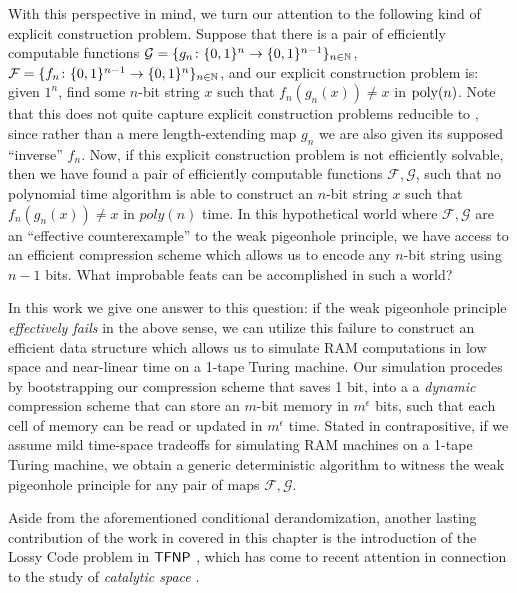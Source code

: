 With this perspective in mind, we turn our attention to the following kind of explicit construction problem. Suppose that there is a pair of efficiently computable functions  $\mathcal{G} = \{g_n \colon \{0,1\}^{n} \rightarrow \{0,1\}^{n-1}\}_{n \in \mathbb{N}}$, $\mathcal{F} = \{f_n \colon \{0,1\}^{n-1} \rightarrow \{0,1\}^n\}_{n \in \mathbb{N}}$, and our explicit construction problem is: given $1^n$, find some $n$-bit string $x$ such that $f_n(g_n(x)) \neq x$ in $\mathrm{poly}(n)$. Note that this does not quite capture explicit construction problems reducible to \avoid, since rather than a mere length-extending map $g_n$ we are also given its supposed ``inverse'' $f_n$. Now, if this explicit construction problem is not efficiently solvable, then we have found a pair of efficiently computable functions $\mathcal{F}, \mathcal{G}$, such that no polynomial time algorithm is able to construct an $n$-bit string $x$ such that $f_n(g_n(x)) \neq x$ in $poly(n)$ time. 
In this hypothetical world where $\mathcal{F}, \mathcal{G}$ are an ``effective counterexample'' to the weak pigeonhole principle, we have access to an efficient compression scheme which allows us to encode any $n$-bit string using $n-1$ bits. What improbable feats can be accomplished in such a world? 

In this work we give one answer to this question: if the weak pigeonhole principle \emph{effectively fails} in the above sense, we can utilize this failure to construct an efficient data structure which allows us to simulate RAM computations in low space and near-linear time on a 1-tape Turing machine. Our simulation procedes by bootstrapping our compression scheme that saves 1 bit, into a a \emph{dynamic} compression scheme that can store an $m$-bit memory in $m^{\epsilon}$ bits, such that each cell of memory can be read or updated in $m^{\epsilon}$ time. 
Stated in contrapositive, if we assume mild time-space tradeoffs for simulating RAM machines on a 1-tape Turing machine, we obtain a generic deterministic algorithm to witness the weak pigeonhole principle for any pair of maps  $\mathcal{F}, \mathcal{G}$. 

Aside from the aforementioned conditional derandomization, another lasting contribution of the work in \cite{time-space} covered in this chapter is the introduction of the {\sc Lossy Code} problem in $\cl{TFNP}$ , which has come to recent attention in connection to the study of \emph{catalytic space} . 


